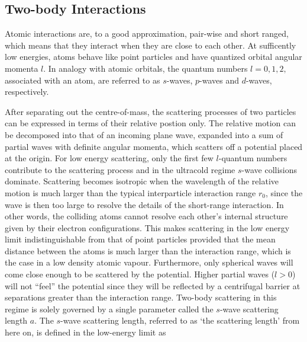 \subsection{Two-body Interactions}
Atomic interactions are, to a good approximation, pair-wise and short ranged, which means that they interact when they are close to each other. At sufficently low energies, atoms behave like point particles and have quantized orbital angular momenta $l$. In analogy with atomic orbitals, the quantum numbers $l=0,1,2,$ associated with an atom, are referred to as $s$-waves, $p$-waves and $d$-waves, respectively. 

After separating out the centre-of-mass, the scattering processes of two particles can be expressed in terms of their relative postion only. The relative motion can be decomposed into that of an incoming plane wave, expanded into a sum of partial waves with definite angular momenta, which scatters off a potential placed at the origin. For low energy scattering, only the first few $l$-quantum numbers contribute to the scattering process and in the ultracold regime $s$-wave collisions dominate. Scattering becomes isotropic when the wavelength of the relative motion is much larger than the typical interparticle interaction range $r_0$, since the wave is then too large to resolve the details of the short-range interaction. In other words, the colliding atoms cannot resolve each other's internal structure given by their electron configurations. This makes scattering in the low energy limit indistinguishable from that of point particles provided that the mean distance between the atoms is much larger than the interaction range, which is the case in a low density atomic vapour. Furthermore, only spherical waves will come close enough to be scattered by the potential. Higher partial waves ($l>0$) will not ``feel'' the potential since they will be reflected by a centrifugal barrier at separations greater than the interaction range. Two-body scattering in this regime is solely governed by a single parameter called the $s$-wave scattering length $a$. The $s$-wave scattering length, referred to as `the scattering length' from here on, is defined in the low-energy limit as

